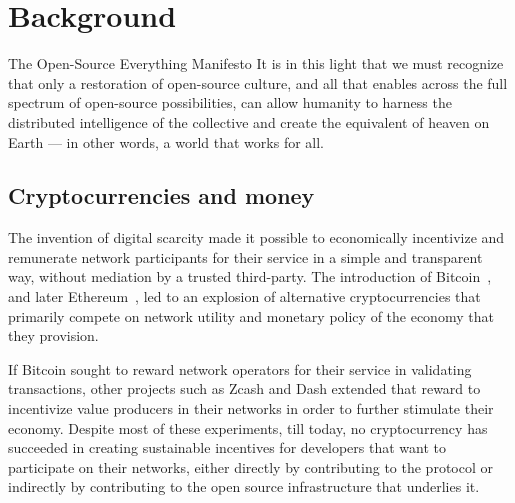 \section{Background}

\begin{epigraph}{The Open-Source Everything Manifesto}
    \noindent It is in this light that we must recognize that only a restoration of
    open-source culture, and all that enables across the full spectrum of
    open-source possibilities, can allow humanity to harness the distributed
    intelligence of the collective and create the equivalent of heaven on Earth
    --- in other words, a world that works for all.
\end{epigraph}

\subsection{Cryptocurrencies and money}

The invention of digital scarcity made it possible to economically incentivize
and remunerate network participants for their service in a simple and
transparent way, without mediation by a trusted third-party. The introduction
of Bitcoin~\cite{bitcoin}, and later Ethereum~\cite{ethereum}, led to an
explosion of alternative cryptocurrencies that primarily compete on network
utility and monetary policy of the economy that they provision.


If Bitcoin sought to reward network operators for their service in validating
transactions, other projects such as Zcash and Dash extended that reward to
incentivize value producers in their networks in order to further stimulate
their economy. Despite most of these experiments, till today, no cryptocurrency
has succeeded in creating sustainable incentives for developers that want to
participate on their networks, either directly by contributing to the protocol
or indirectly by contributing to the open source infrastructure that underlies
it.

